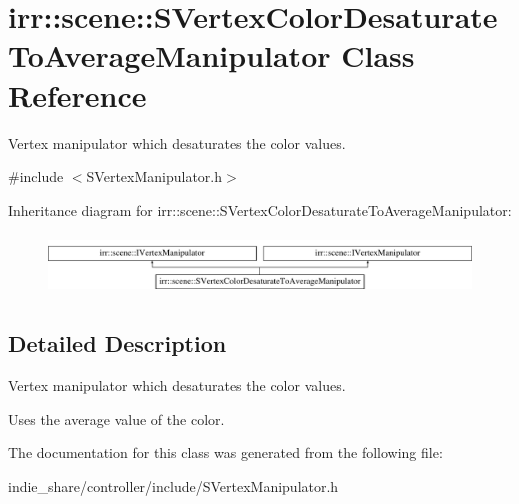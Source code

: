 \hypertarget{classirr_1_1scene_1_1SVertexColorDesaturateToAverageManipulator}{}\section{irr\+:\+:scene\+:\+:S\+Vertex\+Color\+Desaturate\+To\+Average\+Manipulator Class Reference}
\label{classirr_1_1scene_1_1SVertexColorDesaturateToAverageManipulator}


Vertex manipulator which desaturates the color values.  




{\ttfamily \#include $<$S\+Vertex\+Manipulator.\+h$>$}

Inheritance diagram for irr\+:\+:scene\+:\+:S\+Vertex\+Color\+Desaturate\+To\+Average\+Manipulator\+:\begin{figure}[H]
\begin{center}
\leavevmode
\includegraphics[height=1.618497cm]{classirr_1_1scene_1_1SVertexColorDesaturateToAverageManipulator}
\end{center}
\end{figure}


\subsection{Detailed Description}
Vertex manipulator which desaturates the color values. 

Uses the average value of the color. 

The documentation for this class was generated from the following file\+:\begin{DoxyCompactItemize}
\item 
indie\+\_\+share/controller/include/S\+Vertex\+Manipulator.\+h\end{DoxyCompactItemize}
